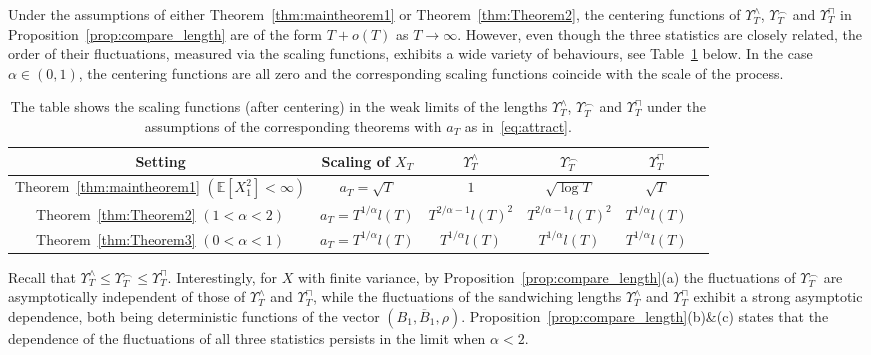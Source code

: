 \documentclass[AHL,Unicode,longabstracts,published]{cedram}
\newcommand\E{\mathds{E}}
\newcommand\1{\mathds{1}}
\newcommand\ov[1]{\overline{#1}}
\begin{document}
Under the assumptions of either Theorem~\ref{thm:maintheorem1} or Theorem~\ref{thm:Theorem2}, the centering functions of $\Upsilon_T^\wedge$, $\Upsilon_T^\frown$ and $\Upsilon_T^\sqcap$ in Proposition~\ref{prop:compare_length} are of the form $T+o(T)$ as $T\to\infty$. However, even though the three statistics are closely related, the order of their fluctuations, measured via the scaling functions, exhibits a wide variety of behaviours, see Table~\ref{tab:compare_length} below. In the case $\alpha\in(0,1)$, the centering functions are all zero and the corresponding scaling functions coincide with the scale of the process.

\begin{table}[ht]
\begin{tabular}{|c|c|c|c|c|c|}
\hline Setting & Scaling of $X_T$ & $\Upsilon_T^\wedge$ & $\Upsilon_T^\frown$ & $\Upsilon_T^\sqcap$\\[0.15em]
\hline Theorem~\ref{thm:maintheorem1} $(\E [X_1^2]<\infty)$ & $a_T=\sqrt{T}$ & $1$ & $\sqrt{\log T}$ & $\sqrt{T}$\\[0.15em]
\hline Theorem~\ref{thm:Theorem2} $(1<\alpha<2)$ & $a_T=T^{1/\alpha}l(T)$ & $T^{2/\alpha-1}l(T)^2$ & $T^{2/\alpha-1}l(T)^2$ & $T^{1/\alpha}l(T)$\\[0.15em]
\hline Theorem~\ref{thm:Theorem3} $(0<\alpha<1)$ & $a_T=T^{1/\alpha}l(T)$ & $T^{1/\alpha}l(T)$ & $T^{1/\alpha}l(T)$ & $T^{1/\alpha}l(T)$\\[0.15em]
\hline
\end{tabular}
\caption{The table shows the scaling functions (after centering) in the weak limits of the lengths $\Upsilon^\wedge_T$, $\Upsilon^\frown_T$ and $\Upsilon^\sqcap_T$ under the assumptions of the corresponding theorems with $a_T$ as in~\eqref{eq:attract}.}\label{tab:compare_length}
\end{table}

Recall that $\Upsilon_T^\wedge\le\Upsilon_T^\frown\le\Upsilon_T^\sqcap$. Interestingly, for $X$ with finite variance, by Proposition~\ref{prop:compare_length}(a) the fluctuations of $\Upsilon_T^\frown$ are asymptotically independent of those of $\Upsilon_T^\wedge$ and $\Upsilon_T^\sqcap$, while the fluctuations of the sandwiching lengths $\Upsilon_T^\wedge$ and $\Upsilon_T^\sqcap$ exhibit a strong asymptotic dependence, both being deterministic functions of the vector $(B_1,\ov B_1,\rho)$. Proposition~\ref{prop:compare_length}(b)\&(c) states that the dependence of the fluctuations of all three statistics persists in the limit when $\alpha<2$.
\end{document}
